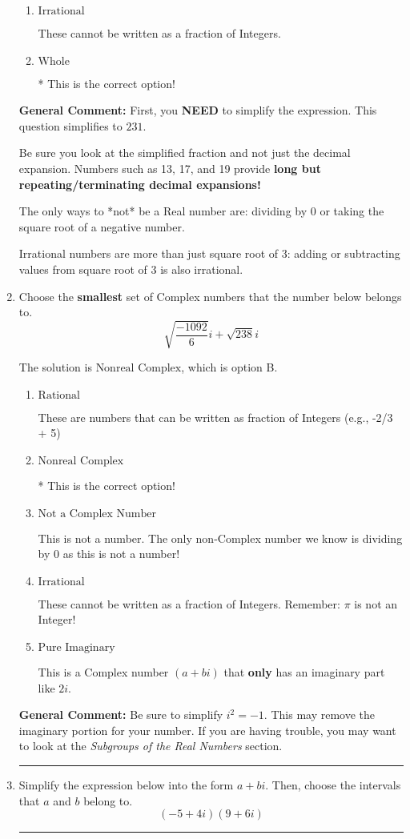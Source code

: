 \documentclass{extbook}[14pt]
\newcommand{\litem}[1]{\item #1

\rule{\textwidth}{0.4pt}}
\begin{document}
\begin{enumerate}
{\begin{enumerate}[label=\Alph*.]
These are Nonreal Complex numbers \textbf{OR} things that are not numbers (e.g., dividing by 0).
\item \( \text{Irrational} \)

These cannot be written as a fraction of Integers.
\item \( \text{Whole} \)

* This is the correct option!
\end{enumerate}

\textbf{General Comment:} First, you \textbf{NEED} to simplify the expression. This question simplifies to $231$. 
 
 Be sure you look at the simplified fraction and not just the decimal expansion. Numbers such as 13, 17, and 19 provide \textbf{long but repeating/terminating decimal expansions!} 
 
 The only ways to *not* be a Real number are: dividing by 0 or taking the square root of a negative number. 
 
 Irrational numbers are more than just square root of 3: adding or subtracting values from square root of 3 is also irrational.
}
\litem{
Choose the \textbf{smallest} set of Complex numbers that the number below belongs to.
\[ \sqrt{\frac{-1092}{6}} i+\sqrt{238}i \]

The solution is \( \text{Nonreal Complex} \), which is option B.\begin{enumerate}[label=\Alph*.]
\item \( \text{Rational} \)

These are numbers that can be written as fraction of Integers (e.g., -2/3 + 5)
\item \( \text{Nonreal Complex} \)

* This is the correct option!
\item \( \text{Not a Complex Number} \)

This is not a number. The only non-Complex number we know is dividing by 0 as this is not a number!
\item \( \text{Irrational} \)

These cannot be written as a fraction of Integers. Remember: $\pi$ is not an Integer!
\item \( \text{Pure Imaginary} \)

This is a Complex number $(a+bi)$ that \textbf{only} has an imaginary part like $2i$.
\end{enumerate}

\textbf{General Comment:} Be sure to simplify $i^2 = -1$. This may remove the imaginary portion for your number. If you are having trouble, you may want to look at the \textit{Subgroups of the Real Numbers} section.
}
\litem{
Simplify the expression below into the form $a+bi$. Then, choose the intervals that $a$ and $b$ belong to.
\[ (-5 + 4 i)(9 + 6 i) \]

}
\end{enumerate}
\end{document}
